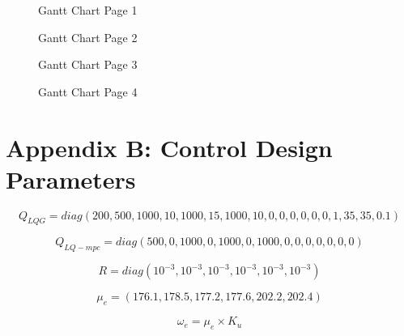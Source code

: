 \documentclass[12pt,a4paper,twoside]{report}
\begin{document}
			\newpage
			
			\begin{figure}[h!]
				\centering 
				
				\caption{Gantt Chart Page 1}
				\label{fig:Gantt Chart Page 1}
			\end{figure}
			
			\newpage
			
			\begin{figure}[h!]
				\centering 
				
				\caption{Gantt Chart Page 2}
				\label{fig:Gantt Chart Page 2}
			\end{figure}
			
			\newpage
			
			\begin{figure}[h!]
				\centering 
				
				\caption{Gantt Chart Page 3}
				\label{fig:Gantt Chart Page 3}
			\end{figure}
		
			\newpage
			
			\begin{figure}[h!]
				\centering 
				
				\caption{Gantt Chart Page 4}
				\label{fig:Gantt Chart Page 4}
			\end{figure}
		
	\chapter*{Appendix B: Control Design Parameters}
	
		\setcounter{MaxMatrixCols}{18}
		\begin{equation}
			Q_{LQG} = diag(200,500,1000,10,1000,15,1000,10,0,0,0,0,0,0,1,35,35,0.1)  
		\end{equation}
		
		\begin{equation}
			Q_{LQ-mpc} = diag(500,0,1000,0,1000,0,1000,0,0,0,0,0,0,0)
		\end{equation}
		
		\begin{equation}
			R = diag(10^{-3},10^{-3},10^{-3},10^{-3},10^{-3},10^{-3})
		\end{equation}
		
		\begin{equation}
			\mu_e = (176.1, 178.5, 177.2, 177.6, 202.2, 202.4)
		\end{equation}
		
		\begin{equation}
			\omega_e = \mu_e \times K_u 
		\end{equation}
		
\end{document}

